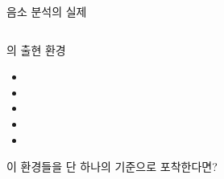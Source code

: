\documentclass[11pt, aspectratio=169]{beamer}
\newcommand{\textds}[1]{{\ipafont #1}}
\begin{document}
\begin{frame}[t]{음소 분석의 실제}
\begin{columns}
\begin{column}[T]{0.3\textwidth}
\begin{block}{\textds{[ɹ]}의 출현 환경}
                \begin{itemize}
                    \item \textds{[g\_\_eɪ]}
                    \item \textds{[pʰɑ\_\_]}
                    \item \textds{[b\_\_oʊkɹ̩]}
                    \item \textds{[\_\_iɡeɪn]}
                    \item \textds{[tʰɑ\_\_]}
                \end{itemize}
            \end{block}
            이 환경들을 단 하나의 기준으로 포착한다면?
        \end{column}
    \end{columns}
\end{frame}
\end{document}
